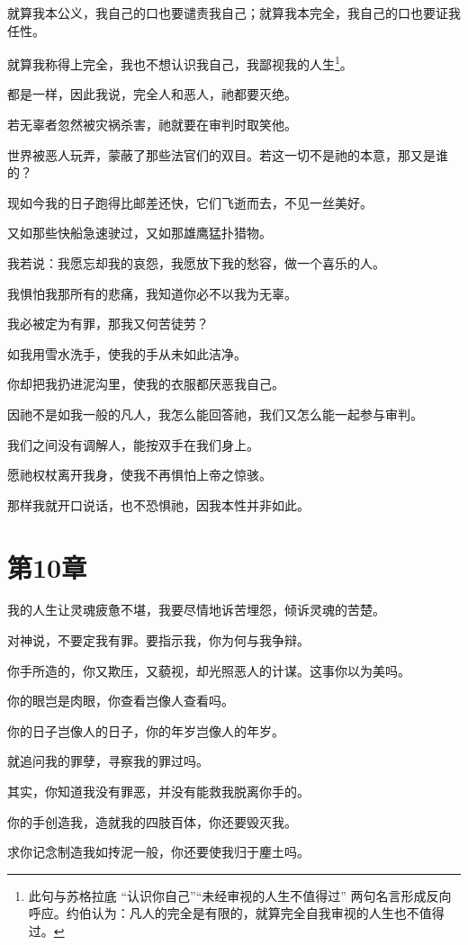 \documentclass[12pt,oneside]{book}
\begin{document}
就算我本公义，我自己的口也要谴责我自己；就算我本完全，我自己的口也要证我任性。

就算我称得上完全，我也不想认识我自己，我鄙视我的人生\footnote{此句与苏格拉底 “认识你自己”“未经审视的人生不值得过” 两句名言形成反向呼应。约伯认为：凡人的完全是有限的，就算完全自我审视的人生也不值得过。}。

都是一样，因此我说，完全人和恶人，祂都要灭绝。

若无辜者忽然被灾祸杀害，祂就要在审判时取笑他。

世界被恶人玩弄，蒙蔽了那些法官们的双目。若这一切不是祂的本意，那又是谁的？

现如今我的日子跑得比邮差还快，它们飞逝而去，不见一丝美好。

又如那些快船急速驶过，又如那雄鹰猛扑猎物。

我若说：我愿忘却我的哀怨，我愿放下我的愁容，做一个喜乐的人。

我惧怕我那所有的悲痛，我知道你必不以我为无辜。

我必被定为有罪，那我又何苦徒劳？

如我用雪水洗手，使我的手从未如此洁净。

你却把我扔进泥沟里，使我的衣服都厌恶我自己。

因祂不是如我一般的凡人，我怎么能回答祂，我们又怎么能一起参与审判。

我们之间没有调解人，能按双手在我们身上。

愿祂权杖离开我身，使我不再惧怕上帝之惊骇。

那样我就开口说话，也不恐惧祂，因我本性并非如此。



\chapter{第10章}
我的人生让灵魂疲惫不堪，我要尽情地诉苦埋怨，倾诉灵魂的苦楚。

对神说，不要定我有罪。要指示我，你为何与我争辩。

你手所造的，你又欺压，又藐视，却光照恶人的计谋。这事你以为美吗。

你的眼岂是肉眼，你查看岂像人查看吗。

你的日子岂像人的日子，你的年岁岂像人的年岁。

就追问我的罪孽，寻察我的罪过吗。

其实，你知道我没有罪恶，并没有能救我脱离你手的。

你的手创造我，造就我的四肢百体，你还要毁灭我。

求你记念制造我如抟泥一般，你还要使我归于麈土吗。
\end{document}
